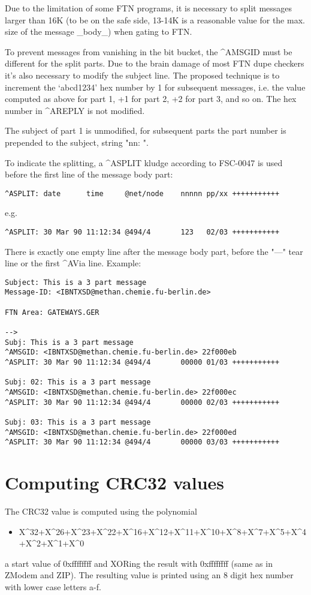 \documentclass[letterpaper]{article}
\begin{document}
Due to the limitation of some FTN programs, it is necessary to split messages larger than 16K (to be on the safe side, 13-14K is a reasonable value for the max. size of the message \_body\_) when gating to FTN.

To prevent messages from vanishing in the bit bucket, the \^{}AMSGID must be different for the split parts. Due to the brain damage of most FTN dupe checkers it's also necessary to modify the subject line.  The proposed technique is to increment the `abcd1234' hex number by 1 for subsequent messages, i.e. the value computed as above for part 1, +1 for part 2, +2 for part 3, and so on. The hex number in \^{}AREPLY is not modified.

The subject of part 1 is unmodified, for subsequent parts the part number is prepended to the subject, string "nn: ".

To indicate the splitting, a \^{}ASPLIT kludge according to FSC-0047 is used before the first line of the message body part:   
\begin{verbatim}
^ASPLIT: date      time     @net/node    nnnnn pp/xx +++++++++++ 
\end{verbatim}


e.g. 
\begin{verbatim}
^ASPLIT: 30 Mar 90 11:12:34 @494/4       123   02/03 +++++++++++ 
\end{verbatim}


There is exactly one empty line after the message body part, before the "---" tear line or the first \^{}AVia line.  Example:   
\begin{verbatim}
Subject: This is a 3 part message 
Message-ID: <IBNTXSD@methan.chemie.fu-berlin.de> 
 
FTN Area: GATEWAYS.GER 
 
--> 
Subj: This is a 3 part message 
^AMSGID: <IBNTXSD@methan.chemie.fu-berlin.de> 22f000eb 
^ASPLIT: 30 Mar 90 11:12:34 @494/4       00000 01/03 +++++++++++ 
 
Subj: 02: This is a 3 part message 
^AMSGID: <IBNTXSD@methan.chemie.fu-berlin.de> 22f000ec 
^ASPLIT: 30 Mar 90 11:12:34 @494/4       00000 02/03 +++++++++++ 
 
Subj: 03: This is a 3 part message 
^AMSGID: <IBNTXSD@methan.chemie.fu-berlin.de> 22f000ed 
^ASPLIT: 30 Mar 90 11:12:34 @494/4       00000 03/03 +++++++++++ 
\end{verbatim}



\section{Computing CRC32 values }



The CRC32 value is computed using the polynomial  
\begin{itemize}
\item X\^{}32+X\^{}26+X\^{}23+X\^{}22+X\^{}16+X\^{}12+X\^{}11+X\^{}10+X\^{}8+X\^{}7+X\^{}5+X\^{}4+X\^{}2+X\^{}1+X\^{}0
\end{itemize}


a start value of 0xffffffff and XORing the result with 0xffffffff (same as in ZModem and ZIP). The resulting value is printed using an 8 digit hex number with lower case letters a-f. 
\end{document}
